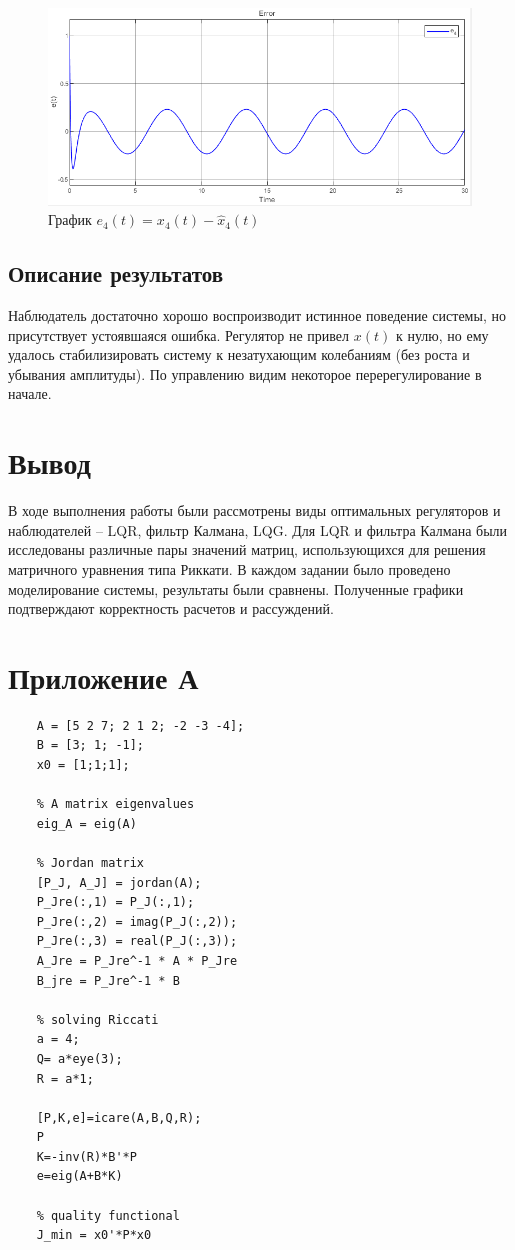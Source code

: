 \documentclass[a4paper, 12pt]{article}
\begin{document}
    \begin{figure}[H]
        \centering
        \includegraphics[scale=0.75]{3task_e4.png}
        \captionsetup{skip=0pt}
        \caption{График $e_4(t)=x_4(t)-\hat{x}_4(t)$}
        \label{fig:3task_e4}
    \end{figure}

    
    \subsection{Описание результатов}
    Наблюдатель достаточно хорошо воспроизводит истинное поведение системы, но присутствует устоявшаяся ошибка.
    Регулятор не привел $x(t)$ к нулю, но ему удалось стабилизировать систему
    к незатухающим колебаниям (без роста и убывания амплитуды). По управлению
    видим некоторое перерегулирование в начале.


    \section{Вывод}
    В ходе выполнения работы были рассмотрены виды оптимальных
    регуляторов и наблюдателей -- LQR, фильтр Калмана, LQG.
    Для LQR и фильтра Калмана были исследованы различные пары
    значений матриц, использующихся для решения матричного уравнения типа Риккати.
    В каждом задании было проведено моделирование системы,
    результаты были сравнены. Полученные графики подтверждают корректность расчетов и рассуждений.


    \section{Приложение А}
    \begin{lstlisting}[label=task1, caption={Программа для задания 1}]
    % plant parameters
    A = [5 2 7; 2 1 2; -2 -3 -4];
    B = [3; 1; -1];
    x0 = [1;1;1];

    % A matrix eigenvalues
    eig_A = eig(A)

    % Jordan matrix
    [P_J, A_J] = jordan(A);
    P_Jre(:,1) = P_J(:,1);
    P_Jre(:,2) = imag(P_J(:,2));
    P_Jre(:,3) = real(P_J(:,3));
    A_Jre = P_Jre^-1 * A * P_Jre
    B_jre = P_Jre^-1 * B

    % solving Riccati
    a = 4;
    Q= a*eye(3);
    R = a*1;

    [P,K,e]=icare(A,B,Q,R);
    P
    K=-inv(R)*B'*P
    e=eig(A+B*K)

    % quality functional
    J_min = x0'*P*x0
    \end{lstlisting}
\end{document}
